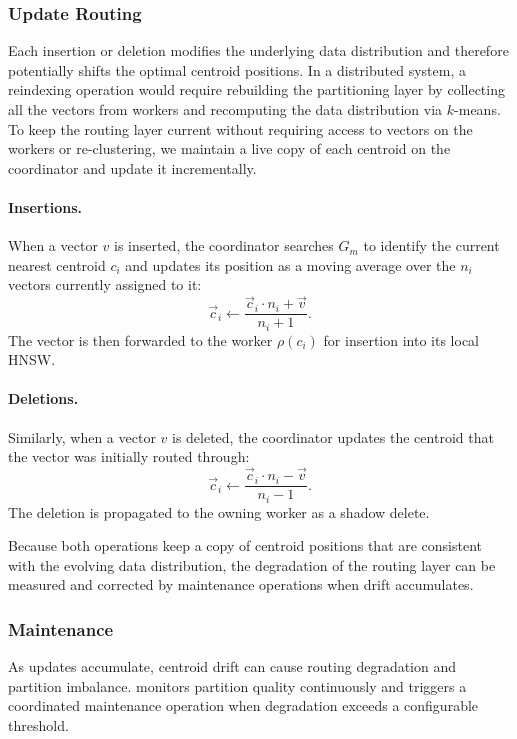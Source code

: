 \documentclass[sigconf,review,anonymous]{acmart}
\begin{document}
\subsubsection{Update Routing}
    Each insertion or deletion modifies the underlying data distribution and therefore potentially shifts the optimal centroid positions. In a distributed system, a reindexing operation would require rebuilding the partitioning layer by collecting all the vectors from workers and recomputing the data distribution via $k$-means. To keep the routing layer current without requiring access to vectors on the workers or re-clustering, we maintain a live copy of each centroid on the coordinator and update it incrementally.

    \paragraph{Insertions.} When a vector $v$ is inserted, the coordinator searches $G_m$ to identify the current nearest centroid $c_i$ and updates its position as a moving average over the $n_i$ vectors currently assigned to it:
    \[
      \vec{c}_i \leftarrow \frac{\vec{c}_i \cdot n_i + \vec{v}}{n_i + 1}.
    \]
    The vector is then forwarded to the worker $\rho(c_i)$ for insertion into its local HNSW.
    
    \paragraph{Deletions.} Similarly, when a vector $v$ is deleted, the coordinator updates the centroid that the vector was initially routed through:
    \[
      \vec{c}_i \leftarrow \frac{\vec{c}_i \cdot n_i - \vec{v}}{n_i - 1}.
    \]
    The deletion is propagated to the owning worker as a shadow delete.
    
    Because both operations keep a copy of centroid positions that are consistent with the evolving data distribution, the degradation of the routing layer can be measured and corrected by maintenance operations when drift accumulates.
    

\subsubsection{Maintenance}
    As updates accumulate, centroid drift can cause routing degradation and partition imbalance. \SystemName{} monitors partition quality continuously and triggers a coordinated maintenance operation when degradation exceeds a configurable threshold.
    
\end{document}
